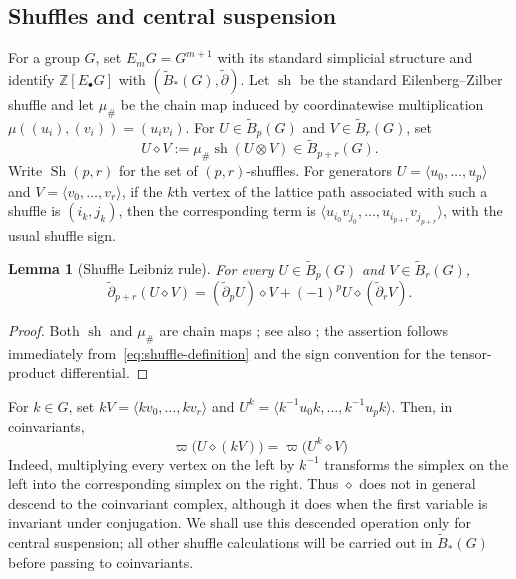 \documentclass[10pt,a4paper]{amsart}
\newtheorem{lemma}[theorem]{Lemma}
\newcommand{\ZZ}{\mathbb Z}
\newcommand{\tB}{\widetilde B}
\newcommand{\td}{\widetilde\partial}
\begin{document}
\subsection{Shuffles and central suspension}
\label{subsec:shuffle-and-suspension}

For a group $G$, set $E_mG=G^{m+1}$ with its standard simplicial
structure and identify $\ZZ[E_\bullet G]$ with $(\tB_*(G),\td)$. Let
$\operatorname{sh}$ be the standard Eilenberg--Zilber shuffle and let
$\mu_\#$ be the chain map induced by coordinatewise multiplication
$\mu((u_i),(v_i))=(u_iv_i)$. For $U\in\tB_p(G)$ and $V\in\tB_r(G)$, set
\begin{equation}
 U\diamond V
 :=\mu_\#\operatorname{sh}(U\otimes V)
 \in\tB_{p+r}(G).
 \label{eq:shuffle-definition}
\end{equation}
Write $\operatorname{Sh}(p,r)$ for
the set of $(p,r)$-shuffles. For generators
$U=\langle u_0,\ldots,u_p\rangle$ and
$V=\langle v_0,\ldots,v_r\rangle$, if the $k$th vertex of the lattice path
associated with such a shuffle is $(i_k,j_k)$, then the corresponding term is
$\langle u_{i_0}v_{j_0},\ldots,u_{i_{p+r}}v_{j_{p+r}}\rangle$, with the usual
shuffle sign.

\begin{lemma}[Shuffle Leibniz rule]
For every $U\in\tB_p(G)$ and $V\in\tB_r(G)$,
\[
        \td_{p+r}(U\diamond V)
        =
        (\td_p U)\diamond V
        +(-1)^p U\diamond(\td_r V).
\]
\end{lemma}

\begin{proof}
Both $\operatorname{sh}$ and $\mu_\#$ are chain maps \cite{EilenbergZilber}; see also \cite[Chapter~VIII, \S8]{MacLaneHomology}; the assertion follows immediately from~\eqref{eq:shuffle-definition} and the sign convention for the tensor-product differential.
\end{proof}

For $k\in G$, set $kV=\langle kv_0,\ldots,kv_r\rangle$ and $U^k=\langle k^{-1}u_0k,\ldots,k^{-1}u_pk\rangle$. Then, in coinvariants,
\begin{equation}
        \varpi\bigl(U\diamond(kV)\bigr)
        =\varpi\bigl(U^k\diamond V\bigr)
        \label{eq:shuffle-conjugation}
\end{equation}
Indeed, multiplying every vertex on the left by $k^{-1}$ transforms the simplex on the left into the corresponding simplex on the right. Thus $\diamond$ does not in general descend to the coinvariant complex, although it does when the first variable is invariant under conjugation. We shall use this descended operation only for central suspension; all other shuffle calculations will be carried out in $\tB_*(G)$ before passing to coinvariants.
\end{document}
